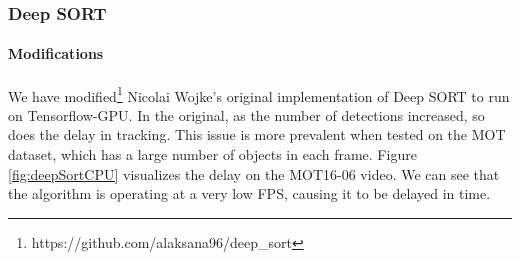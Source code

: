 \subsubsection{Deep SORT} 



\paragraph{Modifications} We have modified\footnote{https://github.com/alaksana96/deep\_sort} Nicolai Wojke's original implementation of Deep SORT to run on Tensorflow-GPU. In the original, as the number of detections increased, so does the delay in tracking. This issue is more prevalent when tested on the MOT dataset, which has a large number of objects in each frame. Figure \ref{fig:deepSortCPU} visualizes the delay on the MOT16-06 video. We can see that the algorithm is operating at a very low FPS, causing it to be delayed in time. 

